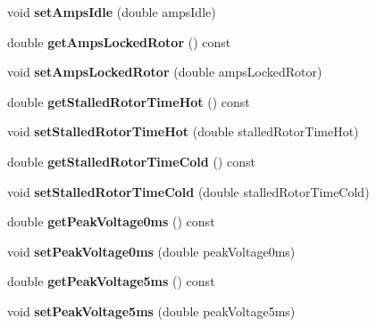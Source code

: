 \begin{DoxyCompactItemize}
void {\bfseries set\+Amps\+Idle} (double amps\+Idle)
\item 
\mbox{\label{class_motor_data_a22917cf90eadc0da1e966257600f5631}} 
double {\bfseries get\+Amps\+Locked\+Rotor} () const
\item 
\mbox{\label{class_motor_data_a65c396ebcd810ce77c5201c19fcfaa81}} 
void {\bfseries set\+Amps\+Locked\+Rotor} (double amps\+Locked\+Rotor)
\item 
\mbox{\label{class_motor_data_aede27e2ea96b57b0c11dd092801868c6}} 
double {\bfseries get\+Stalled\+Rotor\+Time\+Hot} () const
\item 
\mbox{\label{class_motor_data_a18cc65247e2e51cebe93faaceec44642}} 
void {\bfseries set\+Stalled\+Rotor\+Time\+Hot} (double stalled\+Rotor\+Time\+Hot)
\item 
\mbox{\label{class_motor_data_aa8ccd929fc9a25765440fb8b04e71a44}} 
double {\bfseries get\+Stalled\+Rotor\+Time\+Cold} () const
\item 
\mbox{\label{class_motor_data_ad52da7f0ac62233e71564023c22f6138}} 
void {\bfseries set\+Stalled\+Rotor\+Time\+Cold} (double stalled\+Rotor\+Time\+Cold)
\item 
\mbox{\label{class_motor_data_aef4147e64c402f7e89e295b050f302d3}} 
double {\bfseries get\+Peak\+Voltage0ms} () const
\item 
\mbox{\label{class_motor_data_ace2eb139ee2b7d070573ffd201853e41}} 
void {\bfseries set\+Peak\+Voltage0ms} (double peak\+Voltage0ms)
\item 
\mbox{\label{class_motor_data_a63cb35bd7064d68a989a84219b0f210a}} 
double {\bfseries get\+Peak\+Voltage5ms} () const
\item 
\mbox{\label{class_motor_data_a1556adb7bc4d3f92565e6fa3783e1d52}} 
void {\bfseries set\+Peak\+Voltage5ms} (double peak\+Voltage5ms)
\item 
\mbox{\label{class_motor_data_ac67a3f78e851968c9979e60cbf0f495b}} 

\end{DoxyCompactItemize}
